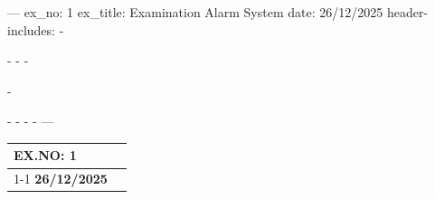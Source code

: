 ---
ex_no: 1
ex_title: Examination Alarm System
date: 26/12/2025
header-includes:
  - \usepackage{needspace}
  - \let\oldsubsection\subsection
  - \renewcommand{\subsection}{\needspace{6\baselineskip}\oldsubsection}
  - \usepackage{multirow}
  - \usepackage{array}
  - \def\exno{1}
  - \def\extitle{Examination Alarm System}
  - \def\exdate{26/12/2025}
  - \pagestyle{empty}
---

\begin{center}
\setlength{\arrayrulewidth}{0.5pt}
\renewcommand{\arraystretch}{2.5}
\begin{tabular}{|p{3cm}|>{\centering\arraybackslash}m{\dimexpr\linewidth-3cm-4\tabcolsep-3\arrayrulewidth\relax}|}
\hline
\centering \textbf{EX.NO: \exno} &
\multirow{2}{=}{\centering\large\textbf{\MakeUppercase{\extitle}}} \\ \cline{1-1}
\centering \textbf{\exdate} & \\ \hline
\end{tabular}
\end{center}

